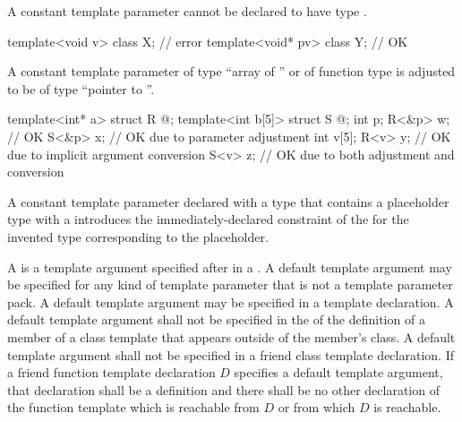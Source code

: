 \pnum
\begin{note}
A constant template parameter
cannot be declared to have type \cv{} .
\begin{example}
\begin{codeblock}
template<void v> class X;       // error
template<void* pv> class Y;     // OK
\end{codeblock}
\end{example}
\end{note}

\pnum
A constant template parameter
%
of type ``array of '' or
%
of function type 
is adjusted to be of type ``pointer to ''.
\begin{example}
\begin{codeblock}
template<int* a>   struct R { @\commentellip@ };
template<int b[5]> struct S { @\commentellip@ };
int p;
R<&p> w;                        // OK
S<&p> x;                        // OK due to parameter adjustment
int v[5];
R<v> y;                         // OK due to implicit argument conversion
S<v> z;                         // OK due to both adjustment and conversion
\end{codeblock}
\end{example}

\pnum
A constant template parameter declared with a type that
contains a placeholder type with a 
introduces the immediately-declared constraint
of the 
for the invented type corresponding to the placeholder.

\pnum
A  is
a template argument specified after \tcode{=}
in a .
A default template argument may be specified for
any kind of template parameter
that is not a template parameter pack.
A default template argument may be specified in a template declaration.
A default template argument shall not be specified in
the 
of the definition of a member of a class template
that appears outside of the member's class.
A default template argument
shall not be specified in a friend class template declaration.
If a friend function template declaration $D$
specifies a default template argument,
that declaration shall be a definition and
there shall be no other declaration of the function template
which is reachable from $D$ or from which $D$ is reachable.

